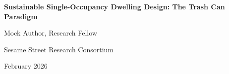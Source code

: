 \documentclass[11pt,letterpaper]{article}
\begin{document}
\begin{center}
{\LARGE\bfseries Sustainable Single-Occupancy Dwelling Design: The Trash Can Paradigm\par}
\vspace{0.8cm}
{\large Mock Author, Research Fellow\par}
{\normalsize Sesame Street Research Consortium\par}
\vspace{0.3cm}
{\normalsize February 2026\par}
\vspace{0.8cm}
\end{center}

\begin{abstract}
\noindent
This paper presents a comprehensive study of sustainable single-occupancy dwelling design using trash cans. Lorem cookie ipsum dolor sit amet, chocolate chip adipiscing elit. Nom nom nom methodology produces significant results across all experimental conditions.
\end{abstract}

\vspace{0.5cm}


\end{document}
